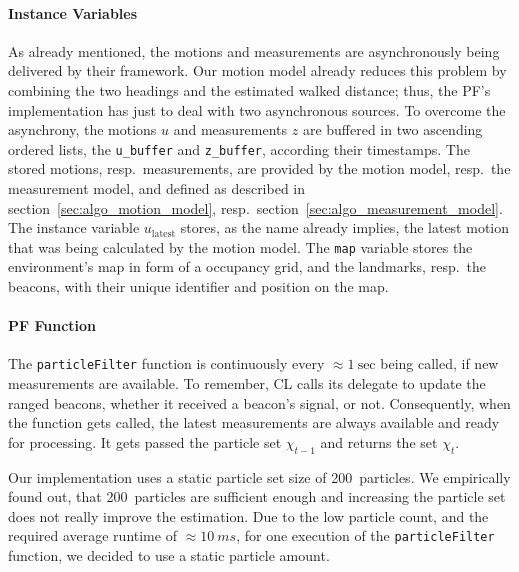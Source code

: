 \paragraph{Instance Variables} As already mentioned, the motions and measurements are asynchronously being delivered by their framework. Our motion model already reduces this problem by combining the two headings and the estimated walked distance; thus, the \acs{PF}'s implementation has just to deal with two asynchronous sources. To overcome the asynchrony, the motions $u$ and measurements $z$ are buffered in two ascending ordered lists, the \texttt{u\_buffer} and \texttt{z\_buffer}, according their timestamps. The stored motions, resp.\ measurements, are provided by the motion model, resp.\ the measurement model, and defined as described in section~\ref{sec:algo_motion_model}, resp.\ section~\ref{sec:algo_measurement_model}. The instance variable $u_\text{latest}$ stores, as the name already implies, the latest motion that was being calculated by the motion model. The \texttt{map} variable stores the environment's map in form of a occupancy grid, and the landmarks, resp.\ the beacons, with their unique identifier and position on the map.

\paragraph{\acs{PF} Function} The \texttt{particleFilter} function is continuously every $\approx 1~\text{sec}$ being called, if new measurements are available. To remember, \ac{CL} calls its delegate to update the ranged beacons, whether it received a beacon's signal, or not. Consequently, when the function gets called, the latest measurements are always available and ready for processing. It gets passed the particle set $\chi_{t-1}$ and returns the set $\chi_t$.

Our implementation uses a static particle set size of 200~particles. We empirically found out, that 200~particles are sufficient enough and increasing the particle set does not really improve the estimation. Due to the low particle count, and the required average runtime of $\approx 10~ms$, for one execution of the \texttt{particleFilter} function, we decided to use a static particle amount.

